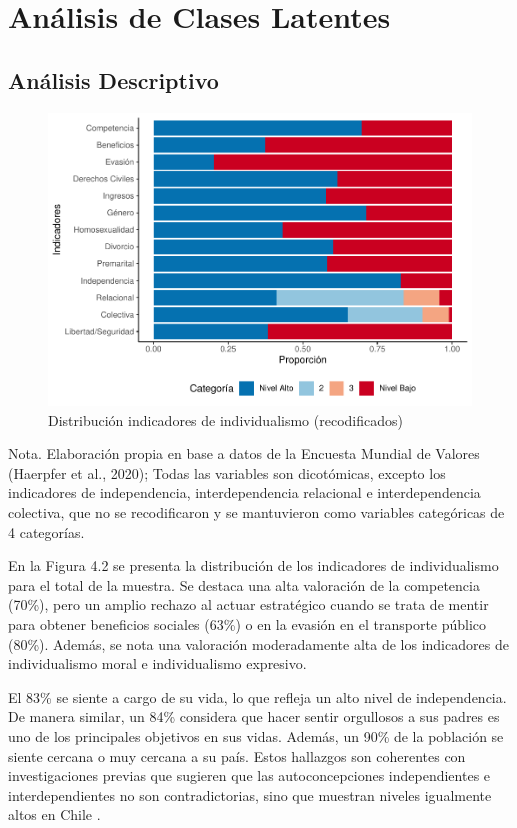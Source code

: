 \documentclass[12pt,twoside]{templates/facsothesis}
\begin{document}
\hypertarget{anuxe1lisis-de-clases-latentes-1}{%
\section{Análisis de Clases Latentes}\label{anuxe1lisis-de-clases-latentes-1}}

\hypertarget{anuxe1lisis-descriptivo-1}{%
\subsection*{Análisis Descriptivo}\label{anuxe1lisis-descriptivo-1}}

\begin{figure}[!ht]

{\centering \includegraphics[width=0.5\linewidth,]{tesis_files/figure-latex/unnamed-chunk-6-1} 

}

\caption{Distribución indicadores de individualismo (recodificados)}\label{fig:unnamed-chunk-6}
\end{figure}
\FloatBarrier

Nota. Elaboración propia en base a datos de la Encuesta Mundial de Valores (Haerpfer et al., 2020); Todas las variables son dicotómicas, excepto los indicadores de independencia, interdependencia relacional e interdependencia colectiva, que no se recodificaron y se mantuvieron como variables categóricas de 4 categorías.

En la Figura 4.2 se presenta la distribución de los indicadores de individualismo para el total de la muestra. Se destaca una alta valoración de la competencia (70\%), pero un amplio rechazo al actuar estratégico cuando se trata de mentir para obtener beneficios sociales (63\%) o en la evasión en el transporte público (80\%). Además, se nota una valoración moderadamente alta de los indicadores de individualismo moral e individualismo expresivo.

El 83\% se siente a cargo de su vida, lo que refleja un alto nivel de independencia. De manera similar, un 84\% considera que hacer sentir orgullosos a sus padres es uno de los principales objetivos en sus vidas. Además, un 90\% de la población se siente cercana o muy cercana a su país. Estos hallazgos son coherentes con investigaciones previas que sugieren que las autoconcepciones independientes e interdependientes no son contradictorias, sino que muestran niveles igualmente altos en Chile \citep{benavides2020, kolstad2009}.
\end{document}
